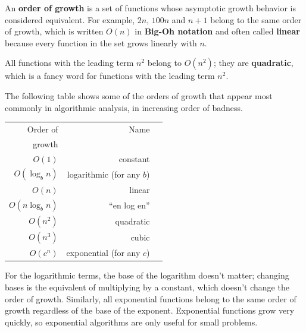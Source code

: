 \documentclass[10pt]{book}
\begin{document}
An {\bf order of growth} is a set of functions whose asymptotic growth
behavior is considered equivalent.  For example, $2n$, $100n$ and $n+1$ 
belong to the same order of growth, which is written $O(n)$ in
{\bf Big-Oh notation} and often called {\bf linear} because every function
in the set grows linearly with $n$.

All functions with the leading term $n^2$ belong to $O(n^2)$; they are
{\bf quadratic}, which is a fancy word for functions with the
leading term $n^2$.

The following table shows some of the orders of growth that
appear most commonly in algorithmic analysis,
in increasing order of badness.

\begin{tabular}{|r|r|r|}
\hline
Order of     &   Name      \\
growth       &               \\
\hline
$O(1)$             & constant \\
$O(\log_b n)$      & logarithmic (for any $b$) \\
$O(n)$             & linear \\
$O(n \log_b n)$    & ``en log en'' \\
$O(n^2)$           & quadratic     \\
$O(n^3)$           & cubic     \\
$O(c^n)$           & exponential (for any $c$)    \\
\hline
\end{tabular}

For the logarithmic terms, the base of the logarithm doesn't matter;
changing bases is the equivalent of multiplying by a constant, which
doesn't change the order of growth.  Similarly, all exponential
functions belong to the same order of growth regardless of the base of
the exponent.
Exponential functions grow very quickly, so exponential algorithms are
only useful for small problems.
\end{document}
